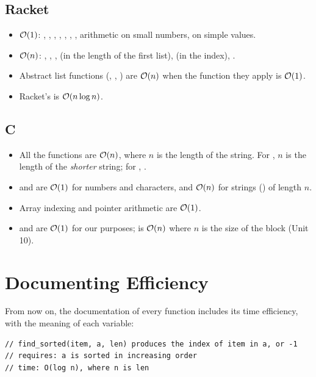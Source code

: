 \subsection{Racket}
\begin{itemize}
  \item $\mathcal{O}(1)$: , , , , ,
    , , arithmetic on small numbers,  on simple values.
  \item $\mathcal{O}(n)$: , , ,  (in the length of
    the first list),  (in the index), .
  \item Abstract list functions (, , ) are $\mathcal{O}(n)$ when the
    function they apply is $\mathcal{O}(1)$.
  \item Racket's  is $\mathcal{O}(n \log n)$.
\end{itemize}

\subsection{C}
\begin{itemize}
  \item All the  functions are $\mathcal{O}(n)$, where $n$ is the length of the string.
    For , $n$ is the length of the \emph{shorter} string; for ,
    .
  \item {} and  are $\mathcal{O}(1)$ for numbers and characters, and $\mathcal{O}(n)$
    for strings () of length $n$.
  \item Array indexing and pointer arithmetic are $\mathcal{O}(1)$.
  \item {} and  are $\mathcal{O}(1)$ for our purposes;  is $\mathcal{O}(n)$
    where $n$ is the size of the block (Unit 10).
\end{itemize}

\section{Documenting Efficiency}

From now on, the documentation of every function includes its time efficiency, with the meaning
of each variable:
\begin{lstlisting}[style=c]
// find_sorted(item, a, len) produces the index of item in a, or -1
// requires: a is sorted in increasing order
// time: O(log n), where n is len
\end{lstlisting}

